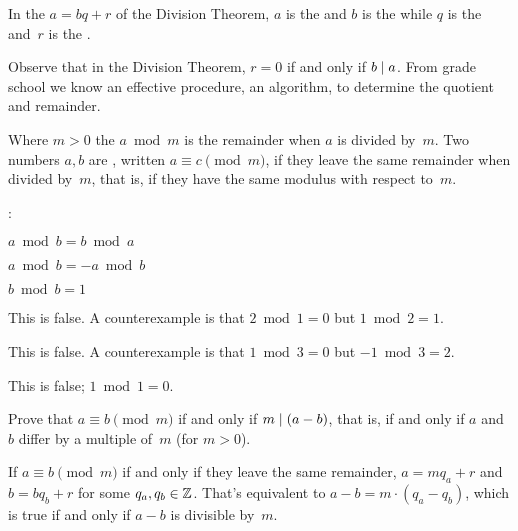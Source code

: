 \documentclass{ibl}  %
\begin{document}
\begin{df}
In the  $a=bq+r$ of the Division Theorem, 
$a$ is the  and
$b$ is the  while 
$q$ is the  and~$r$ is the .  
\end{df}

Observe that in the Division Theorem, $r=0$ if and only if $b\mid a$. 
From grade school we know an effective procedure, an algorithm, to 
determine the quotient and remainder.

\begin{df}
Where $m>0$ the  $a\bmod m$ 
is the remainder when $a$ is divided by~$m$.
Two numbers $a,b$ are , 
written $a\equiv c\pmod m$, 
if they leave the same remainder when divided by~$m$, that is,
if they have the same modulus with respect to~$m$.
\end{df}

\begin{ex}\pord:
\begin{items}
\item $a\bmod b=b\bmod a$
\item $a\bmod b=-a\bmod b$
\item $b\bmod b=1$
\end{items}
\begin{ans}
\begin{exes}
\item This is false.
  A counterexample is that $2\bmod 1=0$ but $1\bmod 2=1$.
\item This is false.
  A counterexample is that $1\bmod 3=0$ but $-1\bmod 3=2$.
\item This is false;
  $1\bmod 1=0$.     
\end{exes}
\end{ans}
\end{ex}

\begin{ex} \label{ex:AEquivBpmodMIFFABDifferBYMultipleOfM}
Prove that $a\equiv b\pmod m$ if and only if $m\mid (a-b)$,
that is, if and only if $a$ and~$b$ differ by a multiple of~$m$
(for $m>0$).  
\begin{ans}
If $a\equiv b\pmod m$ if and only if they leave the same remainder,
$a=mq_a+r$ and~$b=bq_b+r$ for some $q_a,q_b\in\mathbb{Z}$.
That's equivalent to $a-b=m\cdot(q_a-q_b)$, 
which is true if and only if $a-b$ is divisible by~$m$.
\end{ans}
\end{ex}
\end{document}
